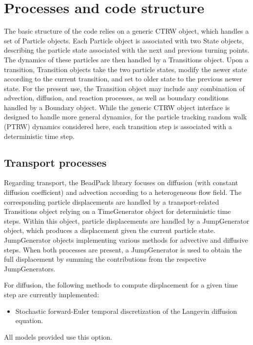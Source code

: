 \documentclass[11pt]{article}
\begin{document}
\section{Processes and code structure}

The basic structure of the code relies on a generic CTRW object, which handles a set of Particle objects. Each Particle object is associated with two State objects, describing the particle state associated with the next and previous turning points. The dynamics of these particles are then handled by a Transitions object. Upon a transition, Transition objects take the two particle states, modify the newer state according to the current transition, and set to older state to the previous newer state. For the present use, the Transition object may include any combination of advection, diffusion, and reaction processes, as well as boundary conditions handled by a Boundary object. While the generic CTRW object interface is designed to handle more general dynamics, for the particle tracking random walk (PTRW) dynamics considered here, each transition step is associated with a deterministic time step.

\subsection{Transport processes}

Regarding transport, the BeadPack library focuses on diffusion (with constant diffusion coefficient) and advection according to a heterogeneous flow field. The corresponding particle displacements are handled by a transport-related Transitions object relying on a TimeGenerator object for deterministic time steps. Within this object, particle displacements are handled by a JumpGenerator object, which produces a displacement given the current particle state. JumpGenerator objects implementing various methods for advective and diffusive steps. When both processes are present, a JumpGenerator is used to obtain the full displacement by summing the contributions from the respective JumpGenerators.

For diffusion, the following methods to compute displacement for a given time step are currently implemented:
%
\begin{itemize}
\item Stochastic forward-Euler temporal discretization of the Langevin diffusion equation.
\end{itemize}
All models provided use this option.
\end{document}
